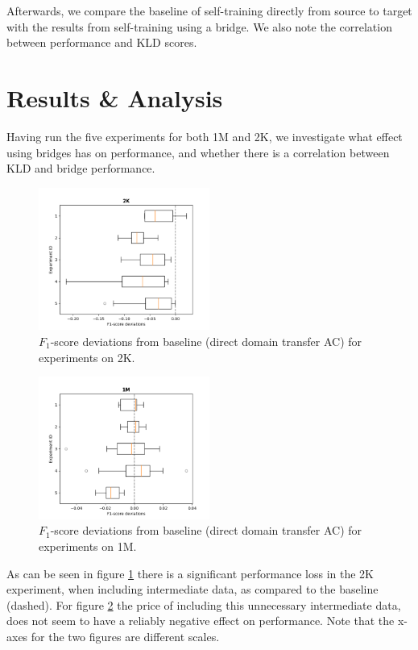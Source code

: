 \documentclass[11pt,a4paper]{article}
\begin{document}
Afterwards, we compare the baseline of self-training directly from source to target with the results from self-training using a bridge. We also note the correlation between performance and KLD scores.

\section*{Results \& Analysis}
Having run the five experiments for both 1M and 2K, we investigate what effect using bridges has on performance, and whether there is a correlation between KLD and bridge performance.

\begin{figure}[h]
    \centering
    \includegraphics[width=0.5\textwidth]{report/boxplots_2K.png}
    \caption{$F_1$-score deviations from baseline (direct domain transfer A\textrightarrow C) for experiments on 2K.}
    \label{fig:box_2k}
\end{figure}
\begin{figure}[h]
    \centering
    \includegraphics[width=0.5\textwidth]{report/boxplots_1M.png}
    \caption{$F_1$-score deviations from baseline (direct domain transfer A\textrightarrow C) for experiments on 1M.}
    \label{fig:box_1M}
\end{figure}
As can be seen in figure \ref{fig:box_2k} there is a significant performance loss in the 2K experiment, when including intermediate data, as compared to the baseline (dashed).
For figure \ref{fig:box_1M} the price of including this unnecessary intermediate data, does not seem to have a reliably negative effect on performance. Note that the x-axes for the two figures are different scales.
\end{document}
